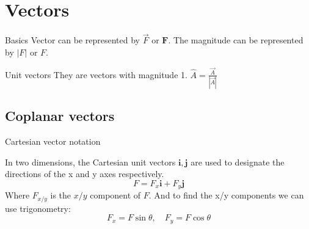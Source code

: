 \documentclass{article}
\begin{document}



\section{Vectors}

\begin{definition}[]{Basics}
    Vector can be represented by $\vec{F}$ or $\boldsymbol{F}$. The magnitude can be represented by $|F|$ or $F$.
\end{definition}








\begin{knBox}[]{Unit vectors}
    They are vectors with magnitude 1. $\hat{A}=\frac{\vec{A}}{|\vec{A}|}$
\end{knBox}

\subsection{Coplanar vectors}
\begin{definition}
    {Cartesian vector notation}

    In two dimensions, the Cartesian unit vectors $\boldsymbol{i}, \boldsymbol{j}$ are used to designate the directions of the x and y axes respectively.
    \[F=F_x \boldsymbol{i} + F_y \boldsymbol{j}\]
    Where $F_{x/y}$ is the $x/y$ component of $F$. And to find the x/y components we can use trigonometry:
    \[F_x=F\sin{\theta},\quad F_y=F\cos{\theta}\]
\end{definition}
\end{document}
